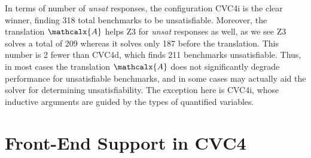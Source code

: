 \documentclass[runningheads,a4paper]{llncs}
\newcommand\cvcd{{\cvc}d\xspace}
\newcommand\cvci{{\cvc}i\xspace}
\newcommand\cvc{CVC4\xspace}
\newcommand\ziii{Z3\xspace}
\newcommand{\conv}{\mathcalx{A}}
\begin{document}
In terms of number of \emph{unsat} responses, the configuration \cvci is the
clear winner, finding 318 total benchmarks to be unsatisfiable. Moreover, the
translation $\conv$ helps \ziii for \emph{unsat} responses as well, as we
see \ziii solves a total of 209 whereas it solves only 187 before the
translation.
%
This number is 2 fewer than \cvcd, which finds 211 benchmarks unsatisfiable. Thus, in
most cases the translation $\conv$ does not significantly degrade performance
for unsatisfiable benchmarks, and in some cases may actually aid the solver for
determining unsatisfiability. The exception here is \cvci, whose inductive
arguments are guided by the types of quantified variables.

\section{Front-End Support in \cvc}
\label{sec:front-end}
\end{document}
